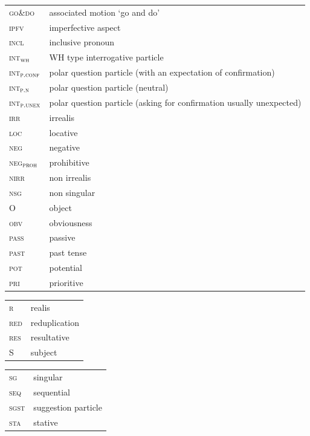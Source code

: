\documentclass[output=paper,colorlinks,citecolor=brown, language=chinese]{langscibook}
\begin{document}
\begin{tabularx}{.5\textwidth}{@{}lQ@{}}
\textsc{go\&do} & associated motion `go and do'\\
\textsc{ipfv} & imperfective aspect \\
\textsc{incl} & inclusive pronoun \\
\textsc{int}$_{\textsc{wh}}$ & WH type interrogative particle \\
\textsc{int}$_{\textsc{p.conf}}$ & polar question particle (with an expectation of confirmation) \\
\textsc{int}$_{\textsc{p.n}}$ & polar question particle (neutral)  \\
\textsc{int}$_{\textsc{p.unex}}$ & polar question particle (asking for confirmation usually unexpected) \\
\textsc{irr} & irrealis\\
\textsc{loc} & locative \\
\textsc{neg} & negative \\
\textsc{neg}$_{\textsc{proh}}$ & prohibitive \\
\textsc{nirr} & non irrealis \\
\textsc{nsg} & non singular \\
\textsc{O} & object \\
\textsc{obv} & obviousness \\
\textsc{pass} & passive \\
\textsc{past} & past tense \\
\textsc{pot} & potential \\
\textsc{pri} & prioritive \end{tabularx}%

\begin{tabularx}{.5\textwidth}{@{}lQ@{}}
\textsc{r} & realis \\
\textsc{red} & reduplication \\
\textsc{res} & resultative \\
\textsc{S} & subject \end{tabularx}%
\begin{tabularx}{.5\textwidth}{@{}lQ@{}}
\textsc{sg} & singular \\
\textsc{seq} & sequential \\
\textsc{sgst} & suggestion particle \\
\textsc{sta} & stative \\
\end{tabularx}
\end{document}
